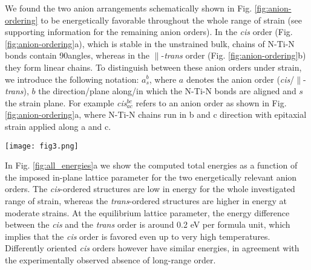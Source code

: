 \documentclass[prl,reprint,aps,twocolumn]{revtex4-1}
\newcommand{\SI}[1]{{#1}}
\begin{document}
We found the two anion arrangements schematically shown in Fig. \ref{fig:anion-ordering} to be energetically favorable throughout the whole range of strain (see \SI{supporting information} for the remaining anion orders). In the \textit{cis} order (Fig. \ref{fig:anion-ordering}a), which is stable in the unstrained bulk, chains of N-Ti-N bonds contain 90\textdegree angles, whereas in the $\parallel$-\textit{trans} order (Fig. \ref{fig:anion-ordering}b) they form linear chains. To distinguish between these anion orders under strain, 
we introduce the following notation: $a_{s}^{b}$, where $a$ denotes the anion order (\textit{cis}/$\parallel$-\textit{trans}), $b$ the direction/plane along/in which the N-Ti-N bonds are aligned and $s$ the strain plane.
For example \textit{cis}$^{bc}_{ac}$ refers to an anion order as shown in Fig. \ref{fig:anion-ordering}a, where N-Ti-N chains run in b and c direction with epitaxial strain applied along a and c. 

\begin{figure*}
\centering
  \texttt{[image: fig3.png]}
  \caption{(a) Total energy as a function of the in-plane lattice parameter. The black and green strain axes at the top refer to the bc and ac area of the relaxed bulk structure respectively. 
Thermodynamically stable structures in the different strain regimes:
(b) $\parallel$-\textit{trans}$_{bc}^{a}$, stable for 
compressive strains\textsubscript{bc} smaller than 4\%; (c) \textit{cis}$^{ac}_{bc}$,  
stable between -4 and 0\% strain\textsubscript{bc}; (d) \textit{cis}$_{ac}^{ac}$, stable between 0 and 2\% strain\textsubscript{ac}; (e) \textit{cis}$_{bc}^{bc}$, stable for more than 3\% tensile strain\textsubscript{bc}.}
 \label{fig:all_energies}
\end{figure*}

In Fig. \ref{fig:all_energies}a we show the computed total energies as a function of the imposed in-plane lattice parameter for the two energetically relevant anion orders. The \textit{cis}-ordered structures are low in energy for the whole investigated range of strain, whereas the \textit{trans}-ordered structures are higher in energy at moderate strains. At the equilibrium lattice parameter, the energy difference between the \textit{cis} and the \textit{trans} order is around 0.2 eV per formula unit, which implies that the \textit{cis} order is favored even up to very high temperatures. Differently oriented \textit{cis} orders however have similar energies, in agreement with the experimentally observed absence of long-range order.
\end{document}
